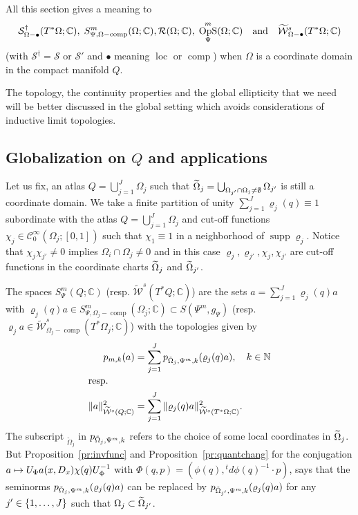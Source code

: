\documentclass[10pt]{amsart}
\theoremstyle{definition}\newtheorem{defi}[theo]{Definition}\newtheorem{rema}[theo]{Remark}\newtheorem{exam}[theo]{Example}\newtheorem{exem}[theo]{Example}\newtheorem{nota}[theo]{Notation}
\newcommand{\C}{\mathbb{C}}
\newcommand{\N}{\mathbb{N}}
\newcommand{\clW}{\mathcal{W}}
\newcommand{\clC}{\mathcal{C}}
\newcommand{\clS}{\mathcal{S}}
\newcommand{\clR}{\mathcal{R}}
\DeclareMathOperator{\OpS}{OpS}
\DeclareMathOperator{\ccomp}{comp}
\DeclareMathOperator{\suppp}{supp}
\DeclareMathOperator{\locc}{loc}
\let\oldtilde\tilde
\renewcommand*{\tilde}[1]{\mathchoice{\widetilde{#1}}{\widetilde{#1}}{\oldtilde{#1}}{\oldtilde{#1}}}
\let\originalleft\left
\let\originalright\right
\renewcommand{\left}{\mathopen{}\mathclose\bgroup\originalleft}
\renewcommand{\right}{\aftergroup\egroup\originalright}
\let\oldmapsto\mapsto
\renewcommand*{\mapsto}{\mathchoice{\longmapsto}{\oldmapsto}{\oldmapsto}{\oldmapsto}}
\begin{document}
All this section gives a meaning to
\[
\clS^{\dagger}_{\Omega-\bullet}(T^{*}\Omega;\C),\; S^{m}_{\Psi,\Omega-\ccomp}(\Omega;\C), \clR(\Omega;\C),\; \OpS^{m}_{\Psi}(\Omega;\C) \quad\text{and}\quad \tilde{\clW}^{s}_{\Omega-\bullet}(T^{*}\Omega;\C)
\]
(with $\clS^{\dagger}=\clS$ or $\clS'$ and $\bullet$ meaning $\locc$ or $\ccomp$) when $\Omega$ is a coordinate domain in the compact manifold $Q$.

The topology, the continuity properties and the global ellipticity that we need will be better discussed in the global setting which avoids considerations of inductive limit topologies.

\subsection{Globalization on \texorpdfstring{$Q$}{Q} and applications}\label{sec:global}

Let us fix, an atlas $Q=\bigcup_{j=1}^{J}\Omega_{j}$ such that $\tilde{\Omega}_{j}=\bigcup_{\Omega_{j'}\cap \Omega_{j}\neq \emptyset}\Omega_{j'}$ is still a coordinate domain. We take a finite partition of unity $\sum_{j=1}^{J}\varrho_{j}(q)\equiv 1$ subordinate with the atlas $Q=\bigcup_{j=1}^{J}\Omega_{j}$ and cut-off functions $\chi_{j}\in \clC^{\infty}_{0}(\Omega_{j};[0,1])$ such that $\chi_{1}\equiv 1$ in a neighborhood of $\suppp\varrho_{j}$. Notice that $\chi_{j}\chi_{j'}\neq 0$ implies $\Omega_{i}\cap \Omega_{j}\neq 0$ and in this case $\varrho_{j},\varrho_{j'},\chi_{j},\chi_{j'}$ are cut-off functions in the coordinate charts $\tilde{\Omega}_{j}$ and $\tilde{\Omega}_{j'}$.

The spaces $S^{m}_{\Psi}(Q;\C)$ (resp. $\widetilde{\clW}^{s}(T^{*}Q;\C)$) are the sets $a=\sum_{j=1}^{J}\varrho_{j}(q)a$ with $\varrho_{j}(q)a\in S^{m}_{\Psi,\Omega_{j}-\ccomp}(\Omega_{j};\C)\subset S(\Psi^{m},g_{\Psi})$ (resp. $\varrho_{j}a \in \widetilde{\clW}^{s}_{\Omega_{j}-\ccomp}(T^{*}\Omega_{j};\C)$) with the topologies given by
\begin{align*}
 p_{m,k}(a)&=\sum_{j=1}^{J}p_{\tilde{\Omega}_{j},\Psi^{m},k}(\varrho_{j}(q)a),\quad k\in \N\\
\intertext{resp.} \|a\|_{\widetilde{\clW}^{s}(Q;\C)}^{2}
&=\sum_{j=1}^{J}\|\varrho_{j}(q)a\|^{2}_{\widetilde{\clW}^{s}(T^{*}\Omega;\C)}.
\end{align*}
The subscript $_{\widetilde{\Omega}_{j}}$ in $p_{\tilde\Omega_{j},\Psi^{m},k}$ refers to the choice of some local coordinates in $\tilde\Omega_{j}$. But Proposition~\ref{pr:invfunc} and Proposition~\ref{pr:quantchang} for the conjugation $a\mapsto U_{\Phi}a(x,D_{x})\chi(q)U_{\Phi}^{-1}$ with $\Phi(q,p)=(\phi(q),{}^{t}d\phi(q)^{-1}\cdot p)$, says that the seminorms $p_{\tilde{\Omega}_{j},\Psi^{m},k}(\varrho_{j}(q)a)$ can be replaced by $p_{\tilde{\Omega}_{j'},\Psi^{m},k}(\varrho_{j}(q)a)$ for any $j'\in \left\{1,\dots,J\right\}$ such that $\Omega_{j}\subset \tilde{\Omega}_{j'}$.
\end{document}
